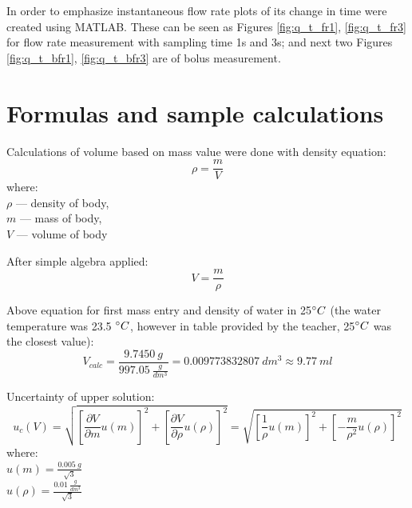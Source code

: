 \documentclass[12pt,a4paper]{article}
\begin{document}
	In order to emphasize instantaneous flow rate plots of its change in time were created using MATLAB. These can be seen as Figures \ref{fig:q_t_fr1}, \ref{fig:q_t_fr3} for flow rate measurement with sampling time 1s and 3s; and next two Figures \ref{fig:q_t_bfr1}, \ref{fig:q_t_bfr3} are of bolus measurement.
	
	\section{Formulas and sample calculations}
	
	Calculations of volume based on mass value were done with density equation:
	\begin{equation}\label{d_eq}
		\rho = \frac{m}{V}
	\end{equation}
	\small
	where: \\
	\indent\indent $\rho$ — density of body,\\
	\indent\indent $m$ — mass of body,\\
	\indent\indent $V$ — volume of body
	\normalsize
	\newline
	
	After simple algebra applied:
	\begin{equation}\label{V_eq}
		V = \frac{m}{\rho}
	\end{equation}
	
	Above equation for first mass entry and density of water in 25$\degree C$ (the water temperature was 23.5 $\degree C$, however in table provided by the teacher, 25$\degree C$ was the closest value):
	\begin{equation}\label{V_eg_eq}
		V_{calc} = \frac{9.7450~g}{997.05~\frac{g}{dm^3}} = 0.009773832807~dm^3 \approx 9.77~ml
	\end{equation}
	
	Uncertainty of upper solution:
	\begin{equation}\label{uc_V_eq}
		u_c(V) = \sqrt{\left[\frac{\partial V}{\partial m} u(m)\right]^2 + \left[\frac{\partial V}{\partial \rho} u(\rho)\right]^2} = \sqrt{\left[\frac{1}{\rho} u(m)\right]^2 + \left[-\frac{m}{\rho^2} u(\rho)\right]^2}
	\end{equation}
	\small
	where: \\
	\indent\indent $u(m) = \frac{0.005~g}{\sqrt{3}}$\\
	\indent\indent $u(\rho) = \frac{0.01~\frac{g}{dm^3}}{\sqrt{3}}$
	\normalsize
	\newline
	
\end{document}
